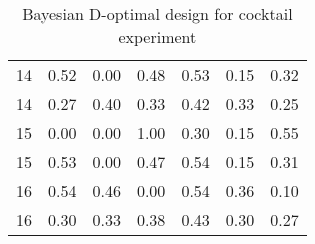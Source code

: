 \begin{table}[ht]
\begin{tabular}{lrrrrrr}
  14 & 0.52 & 0.00 & 0.48 & 0.53 & 0.15 & 0.32 \\ 
  14 & 0.27 & 0.40 & 0.33 & 0.42 & 0.33 & 0.25 \\ 
  15 & 0.00 & 0.00 & 1.00 & 0.30 & 0.15 & 0.55 \\ 
  15 & 0.53 & 0.00 & 0.47 & 0.54 & 0.15 & 0.31 \\ 
  16 & 0.54 & 0.46 & 0.00 & 0.54 & 0.36 & 0.10 \\ 
  16 & 0.30 & 0.33 & 0.38 & 0.43 & 0.30 & 0.27 \\ 
   \hline
\end{tabular}
\caption{Bayesian D-optimal design for cocktail experiment} 
\label{tab:cocktail_exp_d_optimal_des}
\end{table}
